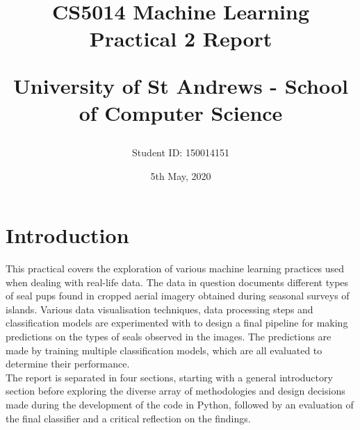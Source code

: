 \documentclass[letterpaper,12pt]{article}
\begin{document}
\title{
    CS5014 Machine Learning\\Practical 2 Report\\
    \begin{large}
    University of St Andrews - School of Computer Science
    \end{large}
}
\author{Student ID: 150014151}
\date{5th May, 2020}
\maketitle
\newpage

\tableofcontents
\newpage


\section{Introduction}
\label{sec:introduction}

This practical covers the exploration of various machine learning practices used when dealing with real-life data. The data in question documents different types of seal pups found in cropped aerial imagery obtained during seasonal surveys of islands. Various data visualisation techniques, data processing steps and classification models are experimented with to design a final pipeline for making predictions on the types of seals observed in the images. The predictions are made by training multiple classification models, which are all evaluated to determine their performance.\\

The report is separated in four sections, starting with a general introductory section before exploring the diverse array of methodologies and design decisions made during the development of the code in Python, followed by an evaluation of the final classifier and a critical reflection on the findings.

\end{document}
